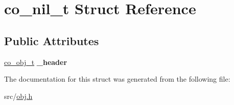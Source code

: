 \hypertarget{structco__nil__t}{\section{co\+\_\+nil\+\_\+t Struct Reference}
\label{structco__nil__t}
}
\subsection*{Public Attributes}
\begin{DoxyCompactItemize}
\item 
\hypertarget{structco__nil__t_a52c9fe1d7b0baa291783dbccadbda6e9}{\hyperlink{structco__obj__t}{co\+\_\+obj\+\_\+t} {\bfseries \+\_\+header}}\label{structco__nil__t_a52c9fe1d7b0baa291783dbccadbda6e9}

\end{DoxyCompactItemize}


The documentation for this struct was generated from the following file\+:\begin{DoxyCompactItemize}
\item 
src/\hyperlink{obj_8h}{obj.\+h}\end{DoxyCompactItemize}
